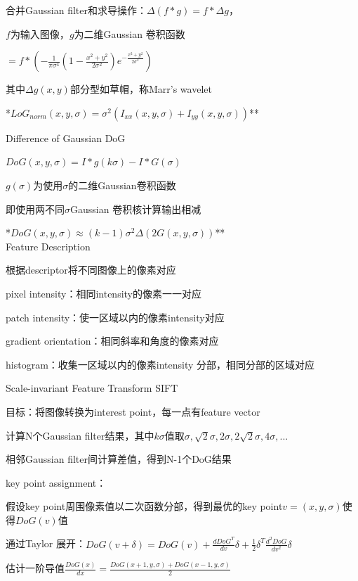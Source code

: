 \documentclass[UTF8]{ctexart}
\begin{document}
  \quad 合并Gaussian filter和求导操作：$\Delta (f * g) = f * \Delta g$，
  
  \quad \quad $f$为输入图像，$g$为二维Gaussian 卷积函数

  \quad \quad $ = f * (-\frac{1}{\pi\sigma^4}(1 - \frac{x^2 + y^2}{2\sigma^2})e^{-\frac{x^2 + y^2}{2\sigma^2}})$

  \quad \quad 其中$\Delta g(x, y)$部分型如草帽，称Marr's wavelet

  \quad **$LoG_{norm}(x, y, \sigma) = \sigma^2(I_{xx}(x, y, \sigma) + I_{yy}(x, y, \sigma))$**

  Difference of Gaussian DoG
  
  \quad $DoG(x, y, \sigma) = I * g(k\sigma) - I * G(\sigma)$
  
  \quad \quad $g(\sigma)$为使用$\sigma$的二维Gaussian卷积函数

  \quad \quad 即使用两不同$\sigma$Gaussian 卷积核计算输出相减
  
  \quad **$DoG(x, y, \sigma) \approx (k - 1)\sigma^2 \Delta (2G(x, y, \sigma))$**\\
Feature Description

  根据descriptor将不同图像上的像素对应

  \quad pixel intensity：相同intensity的像素一一对应

  \quad patch intensity：使一区域以内的像素intensity对应

  \quad gradient orientation：相同斜率和角度的像素对应

  \quad histogram：收集一区域以内的像素intensity 分部，相同分部的区域对应

  Scale-invariant Feature Transform SIFT

  \quad 目标：将图像转换为interest point，每一点有feature vector

  \quad 计算N个Gaussian filter结果，其中$k\sigma$值取$\sigma, \sqrt{2}\sigma, 2\sigma, 2\sqrt{2}\sigma, 4\sigma,...$

  \quad 相邻Gaussian filter间计算差值，得到N-1个DoG结果

  \quad key point assignment：
  
  \quad \quad 假设key point周围像素值以二次函数分部，得到最优的key point$v = (x, y, \sigma)$使得$DoG(v)$值

  \quad \quad 通过Taylor 展开：$DoG(v + \delta) = DoG(v) + \frac{dDoG^T}{dv}\delta + \frac{1}{2}\delta^T\frac{d^2DoG}{dv^2}\delta$

  \quad \quad \quad 估计一阶导值$\frac{DoG(x)}{dx} = \frac{DoG(x + 1, y, \sigma) + DoG(x - 1, y, \sigma)}{2}$
\end{document}
